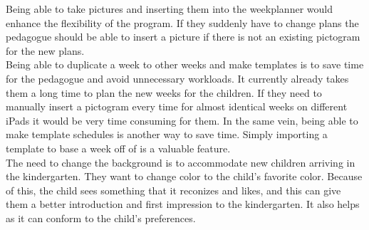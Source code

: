 Being able to take pictures and inserting them into the weekplanner would enhance the flexibility of the program.
If they suddenly have to change plans the pedagogue should be able to insert a picture if there is not an existing pictogram for the new plans.
\\
Being able to duplicate a week to other weeks and make templates is to save time for the pedagogue and avoid unnecessary workloads. 
It currently already takes them a long time to plan the new weeks for the children. 
If they need to manually insert a pictogram every time for almost identical weeks on different iPads it would be very time consuming for them.
In the same vein, being able to make template schedules is another way to save time. 
Simply importing a template to base a week off of is a valuable feature.
\\
The need to change the background is to accommodate new children arriving in the kindergarten. 
They want to change color to the child's favorite color. 
Because of this, the child sees something that it reconizes and likes, and this can give them a better introduction and first impression to the kindergarten.
It also helps as it can conform to the child's preferences.
